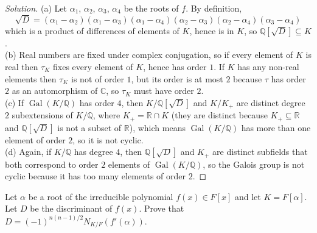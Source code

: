 \documentclass[10pt]{article}
\providecommand{\Gal}{\operatorname{Gal}}
\providecommand{\CC}{\mathbb C}
\providecommand{\QQ}{\mathbb Q}
\providecommand{\RR}{\mathbb R}
\newenvironment{soln}{\begin{proof}[Solution]}{\end{proof}}
\begin{document}
\begin{soln}
    (a) Let $\alpha_1$, $\alpha_2$, $\alpha_3$, $\alpha_4$
    be the roots of $f$. By definition,
    \begin{equation*}
        \sqrt D = (\alpha_1-\alpha_2)
	(\alpha_1-\alpha_3)
	(\alpha_1-\alpha_4)
	(\alpha_2-\alpha_3)
	(\alpha_2-\alpha_4)
	(\alpha_3-\alpha_4)
    \end{equation*}
    which is a product of differences of elements of $K$,
    hence is in $K$, so $\QQ[\sqrt D]\subseteq K$.
    \\

    (b) Real numbers are fixed under complex conjugation,
    so if every element of $K$ is real
    then $\tau_K$ fixes every element of $K$, hence has order $1$.
    If $K$ has any non-real elements
    then $\tau_K$ is not of order $1$,
    but its order is at most $2$ because
    $\tau$ has order $2$ as an automorphism of $\CC$,
    so $\tau_K$ must have order $2$.
    \\

    (c) If $\Gal(K/\QQ)$ has order $4$, then
    $K/\QQ[\sqrt D]$ and $K/K_+$ are distinct degree $2$ subextensions
    of $K/\QQ$, where $K_+ = \RR\cap K$
    (they are distinct because $K_+\subseteq\RR$
    and $\QQ[\sqrt D]$ is not a subset of $\RR$),
    which means $\Gal(K/\QQ)$ has more than one element of order $2$,
    so it is not cyclic.
    \\

    (d) Again, if $K/\QQ$ has degree $4$,
    then $\QQ[\sqrt D]$ and $K_+$
    are distinct subfields that both correspond to
    order $2$ elements of $\Gal(K/\QQ)$,
    so the Galois group is not cyclic because it has too many
    elements of order $2$.
\end{soln}

\begin{problem}
    [\S14.6\#28]
    Let $\alpha$ be a root of the irreducible polynomial
    $f(x)\in F[x]$ and let $K = F[\alpha]$.
    Let $D$ be the discriminant of $f(x)$.
    Prove that $D = (-1)^{n(n-1)/2} N_{K/F}(f'(\alpha))$.
\end{problem}
\end{document}
